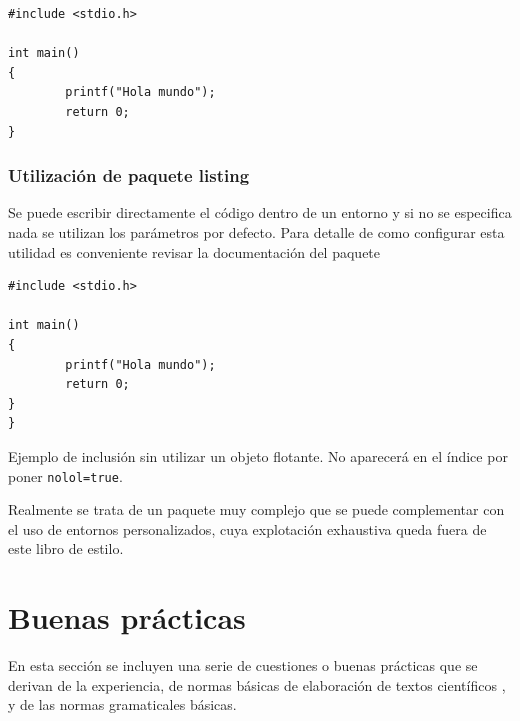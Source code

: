 \begin{verbatim}
#include <stdio.h>

int main()
{
        printf("Hola mundo");
        return 0;
}
\end{verbatim}

\subsection{Utilización de paquete listing}


Se puede escribir directamente el código dentro de un entorno y si no se especifica nada se utilizan los parámetros por defecto. Para detalle de como configurar esta utilidad es conveniente revisar la documentación del paquete

\begin{lstlisting}[caption=Ejemplo ]
#include <stdio.h>

int main()
{
        printf("Hola mundo");
        return 0;
}
}
\end{lstlisting}


Ejemplo de inclusión sin utilizar un objeto flotante. No aparecerá en el índice por poner \lstinline[language=enparrafo]!nolol=true!.







Realmente se trata de un paquete muy complejo que se puede complementar con el uso de entornos personalizados, cuya explotación exhaustiva queda fuera de este libro de estilo.


\chapter {Buenas prácticas}


En esta sección se incluyen una serie de cuestiones o buenas prácticas que se derivan de la experiencia, de normas básicas de elaboración de textos científicos \cite{alba2009}, y de las normas gramaticales básicas.

